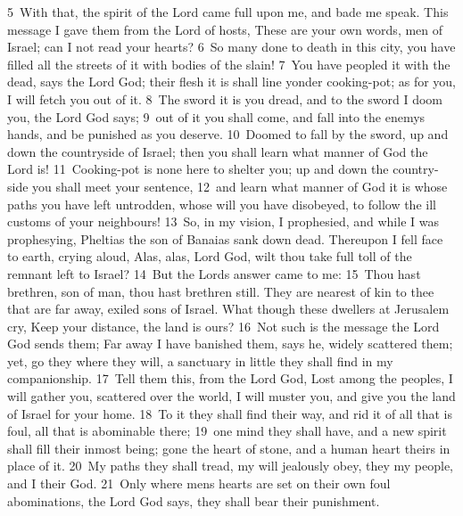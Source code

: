 \documentclass[10pt]{book} %
\begin{document}
\textcolor{benred8}{5}~With that, the spirit of the Lord came full upon me, and bade me speak. This message I gave them from the Lord of hosts, These are your own words, men of Israel; can I not read your hearts? \textcolor{benred8}{6}~So many done to death in this city, you have filled all the streets of it with bodies of the slain! \textcolor{benred8}{7}~You have peopled it with the dead, says the Lord God; their flesh it is shall line yonder cooking-pot; as for you, I will fetch you out of it. \textcolor{benred8}{8}~The sword it is you dread, and to the sword I doom you, the Lord God says; \textcolor{benred8}{9}~out of it you shall come, and fall into the enemy\textquotesingle s hands, and be punished as you deserve. \textcolor{benred8}{10}~Doomed to fall by the sword, up and down the countryside of Israel; then you shall learn what manner of God the Lord is! \textcolor{benred8}{11}~Cooking-pot is none here to shelter you; up and down the country-side you shall meet your sentence, \textcolor{benred8}{12}~and learn what manner of God it is whose paths you have left untrodden, whose will you have disobeyed, to follow the ill customs of your neighbours!
\textcolor{benred8}{13}~So, in my vision, I prophesied, and while I was prophesying, Pheltias the son of Banaias sank down dead. Thereupon I fell face to earth, crying aloud, Alas, alas, Lord God, wilt thou take full toll of the remnant left to Israel? \textcolor{benred8}{14}~But the Lord\textquotesingle s answer came to me: \textcolor{benred8}{15}~Thou hast brethren, son of man, thou hast brethren still. They are nearest of kin to thee that are far away, exiled sons of Israel. What though these dwellers at Jerusalem cry, Keep your distance, the land is ours? \textcolor{benred8}{16}~Not such is the message the Lord God sends them; Far away I have banished them, says he, widely scattered them; yet, go they where they will, a sanctuary in little they shall find in my companionship. \textcolor{benred8}{17}~Tell them this, from the Lord God, Lost among the peoples, I will gather you, scattered over the world, I will muster you, and give you the land of Israel for your home. \textcolor{benred8}{18}~To it they shall find their way, and rid it of all that is foul, all that is abominable there; \textcolor{benred8}{19}~one mind they shall have, and a new spirit shall fill their inmost being; gone the heart of stone, and a human heart theirs in place of it. \textcolor{benred8}{20}~My paths they shall tread, my will jealously obey, they my people, and I their God. \textcolor{benred8}{21}~Only where men\textquotesingle s hearts are set on their own foul abominations, the Lord God says, they shall bear their punishment.
\end{document}
